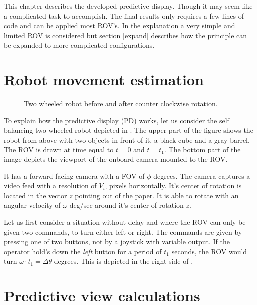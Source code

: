 This chapter describes the developed predictive display. Though it may seem like a complicated task to accomplish. The final results only requires a few lines of code and can be applied most ROV's. In the explanation a very simple and limited ROV is considered but section \ref{expand} describes how the principle can be expanded to more complicated configurations.

\section{Robot movement estimation}
 
\begin{figure}[h!]    
    \centering           
    \def\svgwidth{.8\columnwidth}
    
    \caption{Two wheeled robot before and after counter clockwise rotation.}
    \label{twoWheeled}
\end{figure}

 
To explain how the predictive display (PD) works, let us consider the self balancing two wheeled robot depicted in . The upper part of the figure shows the robot from above with two objects in front of it, a black cube and a gray barrel. The ROV is drawn at time equal to $t=0$ and $t=t_1$. The bottom part of the image depicts the viewport of the onboard camera mounted to the ROV.

It has a forward facing camera with a FOV of $\phi$ degrees. The camera captures a video feed with a resolution of $V_w$ pixels horizontally. It's center of rotation is located in the vector $z$ pointing out of the paper. It is able to rotate with an angular velocity of $\omega$ deg/sec around it's center of rotation $z$.

Let us first consider a situation without delay and where the ROV can only be given two commands, to turn either left or right. The commands are given by pressing one of two buttons, not by a joystick with variable output. If the operator hold's down the \emph{left} button for a period of $t_1$ seconds, the ROV would turn $\omega \cdot t_1 = \Delta \theta$ degrees. This is depicted in the right side of .

\section{Predictive view calculations}

